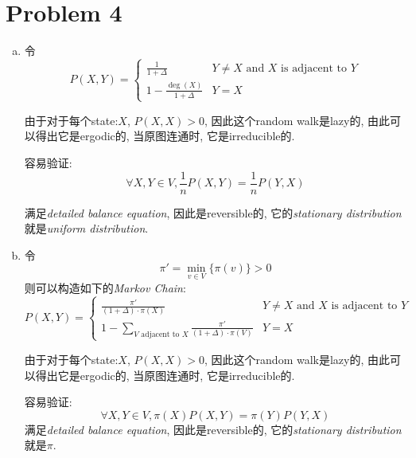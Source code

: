 \documentclass[paper=a4, fontsize=11pt]{scrartcl} %
\numberwithin{figure}{section} %
\numberwithin{table}{section} %
\begin{document}
\section*{Problem 4}
\begin{enumerate}[(a)]
\item
	令
	$$P(X, Y) = \left\{\begin{array}{ll} 
		\frac{1}{1 + \Delta} & Y \not= X \textrm{ and $X$ is adjacent to $Y$} \\
		1 - \frac{\deg(X)}{1 + \Delta} & Y = X
	\end{array}\right.$$

	由于对于每个state:$X$, $P(X,X) > 0$, 因此这个random walk是lazy的, 由此可以得出它是ergodic的, 当原图连通时, 它是irreducible的.

	容易验证:
	$$\forall X, Y\in V, \frac{1}{n}P(X, Y) = \frac{1}{n}P(Y, X) $$

	满足\textit{detailed balance equation}, 因此是reversible的, 它的\textit{stationary distribution}就是\textit{uniform distribution}.
\item
	令
	$$\pi' = \min_{v\in V}\{\pi(v)\} > 0$$
	则可以构造如下的\textit{Markov Chain}:
	$$
	P(X, Y) = \left\{
	\begin{array}{ll}
		\frac{\pi'}{\left(1 + \Delta\right)\cdot\pi(X)} & Y \not= X \textrm{ and $X$ is adjacent to $Y$}\\
		1 - \sum\limits_{V\textrm{ adjacent to } X}\frac{\pi'}{\left(1 + \Delta\right)\cdot\pi(V)} & Y = X
	\end{array}
	\right.
	$$
	
	由于对于每个state:$X$, $P(X,X) > 0$, 因此这个random walk是lazy的, 由此可以得出它是ergodic的, 当原图连通时, 它是irreducible的.

	容易验证:
	$$\forall X, Y\in V, \pi(X)P(X, Y) = \pi(Y)P(Y, X) $$
	满足\textit{detailed balance equation}, 因此是reversible的, 它的\textit{stationary distribution}就是$\pi$.	
\end{enumerate}
\end{document}
